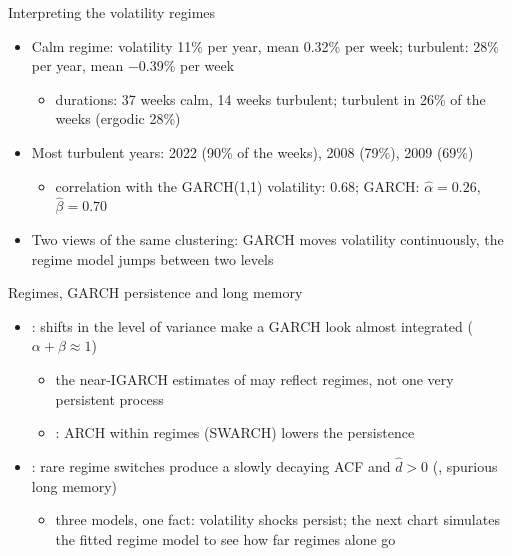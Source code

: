 \begin{frame}{Interpreting the volatility regimes}
\itemsize{\small}
\begin{itemize}
    \item Calm regime: volatility 11\% per year, mean 0.32\% per week; turbulent: 28\% per year, mean \ensuremath{-}0.39\% per week
    \begin{itemize}
        \item durations: 37 weeks calm, 14 weeks turbulent; turbulent in 26\% of the weeks (ergodic 28\%)
    \end{itemize}
    \item Most turbulent years: 2022 (90\% of the weeks), 2008 (79\%), 2009 (69\%)
    \begin{itemize}
        \item correlation with the GARCH(1,1) volatility: 0.68; GARCH: $\hat\alpha = 0.26$, $\hat\beta = 0.70$
    \end{itemize}
    \item Two views of the same clustering: GARCH moves volatility continuously, the regime model jumps between two levels
\end{itemize}
\end{frame}

\begin{frame}{Regimes, GARCH persistence and long memory}
\itemsize{\small}
\begin{itemize}
    \item {}: shifts in the level of variance make a GARCH look almost integrated ($\alpha + \beta \approx 1$)
    \begin{itemize}
        \item the near-IGARCH estimates of  may reflect regimes, not one very persistent process
        \item {}: ARCH within regimes (SWARCH) lowers the persistence
    \end{itemize}
    \item {}: rare regime switches produce a slowly decaying ACF and $\hat d > 0$ (, spurious long memory)
    \begin{itemize}
        \item three models, one fact: volatility shocks persist; the next chart simulates the fitted regime model to see how far regimes alone go
    \end{itemize}
\end{itemize}
\end{frame}

